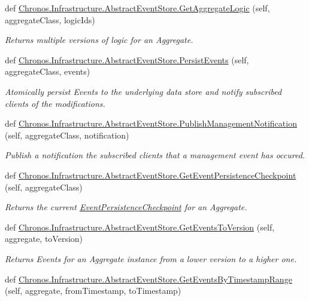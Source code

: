 \begin{DoxyCompactItemize}
def \hyperlink{group__Chronos_gae000957aba7b70433c500fd97e0893e8}{Chronos.\+Infrastructure.\+Abstract\+Event\+Store.\+Get\+Aggregate\+Logic} (self, aggregate\+Class, logic\+Ids)
\begin{DoxyCompactList}\small\item\em Returns multiple versions of logic for an Aggregate. \end{DoxyCompactList}\item 
def \hyperlink{group__Chronos_gad7ca7261b0789dd61ca81a60ee414f94}{Chronos.\+Infrastructure.\+Abstract\+Event\+Store.\+Persist\+Events} (self, aggregate\+Class, events)
\begin{DoxyCompactList}\small\item\em Atomically persist Events to the underlying data store and notify subscribed clients of the modifications. \end{DoxyCompactList}\item 
def \hyperlink{group__Chronos_gaf08457efe1c1b5f45451547f543b2fd6}{Chronos.\+Infrastructure.\+Abstract\+Event\+Store.\+Publish\+Management\+Notification} (self, aggregate\+Class, notification)
\begin{DoxyCompactList}\small\item\em Publish a notification the subscribed clients that a management event has occured. \end{DoxyCompactList}\item 
def \hyperlink{group__Chronos_gaaf58520cf6503cad9967af939efca480}{Chronos.\+Infrastructure.\+Abstract\+Event\+Store.\+Get\+Event\+Persistence\+Checkpoint} (self, aggregate\+Class)
\begin{DoxyCompactList}\small\item\em Returns the current \hyperlink{classChronos_1_1Infrastructure_1_1EventPersistenceCheckpoint}{Event\+Persistence\+Checkpoint} for an Aggregate. \end{DoxyCompactList}\item 
def \hyperlink{group__Chronos_ga33cde926e84482f515173ebec9852030}{Chronos.\+Infrastructure.\+Abstract\+Event\+Store.\+Get\+Events\+To\+Version} (self, aggregate, to\+Version)
\begin{DoxyCompactList}\small\item\em Returns Events for an Aggregate instance from a lower version to a higher one. \end{DoxyCompactList}\item 
def \hyperlink{group__Chronos_gae9298fb619df87b9181b881acde8f013}{Chronos.\+Infrastructure.\+Abstract\+Event\+Store.\+Get\+Events\+By\+Timestamp\+Range} (self, aggregate, from\+Timestamp, to\+Timestamp)

\end{DoxyCompactItemize}
